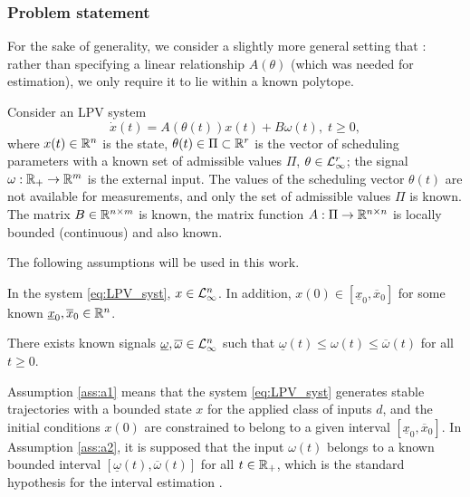 \subsubsection{Problem statement}
\label{sec:Problem-statement}

For the sake of generality, we consider a slightly more general setting that : rather than specifying a linear relationship $A(\theta)$ (which was needed for estimation), we only require it to lie within a known polytope.

Consider an LPV system
\begin{equation}
\dot{x}(t)=A(\theta(t))x(t)+B\omega(t),\;t\geq0,\label{eq:LPV_syst}
\end{equation}
where $x(t)\in\mathbb{R}^{n}$ is the state, $\theta(t)\in\Pi\subset\mathbb{R}^{r}$ is the vector of scheduling parameters with a known set of admissible values $\Pi$, $\theta\in\mathcal{L}_{\infty}^{r}$; the signal $\omega:\mathbb{R}_{+}\to\mathbb{R}^{m}$ is the external input. The values of the scheduling vector $\theta(t)$ are not available for measurements, and only the set of admissible values $\Pi$ is known. The matrix $B\in\mathbb{R}^{n\times m}$ is known, the matrix function $A:\Pi\to\mathbb{R}^{n\times n}$ is locally bounded (continuous) and also known.

The following assumptions will be used in this work.
\begin{assumption}
	\label{ass:a1}
	\begin{leftbar}[assumptionbar]
		In the system \eqref{eq:LPV_syst}, $x\in\mathcal{L}_{\infty}^{n}$. In addition, $x(0)\in[\underline{x}_{0},\overline{x}_{0}]$ for some known $\underline{x}_{0},\overline{x}_{0}\in\mathbb{R}^{n}$.
	\end{leftbar}
\end{assumption}

\begin{assumption}
	\label{ass:a2}
	\begin{leftbar}[assumptionbar]
		There exists known signals $\underline{\omega},\overline{\omega}\in\mathcal{L}_{\infty}^{n}$ such that $\underline{\omega}(t)\leq \omega(t)\leq\overline{\omega}(t)$ for all $t\geq0$.
	\end{leftbar}
\end{assumption}
Assumption \ref{ass:a1} means that the system \eqref{eq:LPV_syst} generates stable trajectories with a bounded state $x$ for the applied class of inputs $d$, and the initial conditions $x(0)$ are constrained to belong to a given interval $[\underline{x}_{0},\overline{x}_{0}]$. In Assumption \ref{ass:a2}, it is supposed that the input $\omega(t)$ belongs to a known bounded interval $[\underline{\omega}(t),\overline{\omega}(t)]$ for all $t\in\mathbb{R}_{+}$, which is the standard hypothesis for the interval estimation \citep{Efimov2016,Raiessi2018}.

